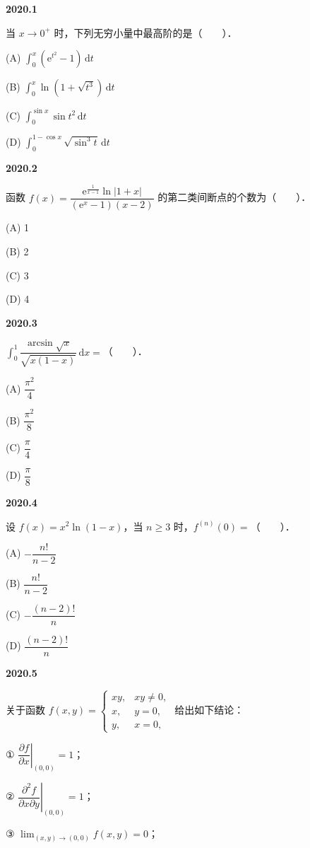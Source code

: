 \documentclass[UTF8,12pt,fontset=windows]{ctexart}
\begin{document}
{\large\bfseries 2020.1}

当 $x \to 0^+$ 时，下列无穷小量中最高阶的是（　　）．

(A) $\displaystyle\int_{0}^{x} (\mathrm{e}^{t^2} - 1)\,\mathrm{d}t$

(B) $\displaystyle\int_{0}^{x} \ln(1 + \sqrt{t^3})\,\mathrm{d}t$

(C) $\displaystyle\int_{0}^{\sin x} \sin t^2\,\mathrm{d}t$

(D) $\displaystyle\int_{0}^{1-\cos x} \sqrt{\sin^3 t}\,\mathrm{d}t$

\vfill
\newpage
{\large\bfseries 2020.2}

函数 $f(x) = \dfrac{\mathrm{e}^{\frac{1}{x-1}}\ln|1+x|}{(\mathrm{e}^x - 1)(x-2)}$ 的第二类间断点的个数为（　　）．

(A) 1

(B) 2

(C) 3

(D) 4

\vfill
\newpage
{\large\bfseries 2020.3}

$\displaystyle\int_{0}^{1} \dfrac{\arcsin\sqrt{x}}{\sqrt{x(1-x)}}\,\mathrm{d}x =$（　　）．

(A) $\dfrac{\pi^2}{4}$

(B) $\dfrac{\pi^2}{8}$

(C) $\dfrac{\pi}{4}$

(D) $\dfrac{\pi}{8}$

\vfill
\newpage
{\large\bfseries 2020.4}

设 $f(x) = x^2\ln(1-x)$，当 $n \geqslant 3$ 时，$f^{(n)}(0) =$（　　）．

(A) $-\dfrac{n!}{n-2}$

(B) $\dfrac{n!}{n-2}$

(C) $-\dfrac{(n-2)!}{n}$

(D) $\dfrac{(n-2)!}{n}$

\vfill
\newpage
{\large\bfseries 2020.5}

关于函数 $f(x,y) = \begin{cases} xy, & xy \neq 0, \\ x, & y = 0, \\ y, & x = 0, \end{cases}$ 给出如下结论：

① $\left.\dfrac{\partial f}{\partial x}\right|_{(0,0)} = 1$；

② $\left.\dfrac{\partial^2 f}{\partial x \partial y}\right|_{(0,0)} = 1$；

③ $\lim_{(x,y)\to(0,0)} f(x,y) = 0$；
\end{document}

